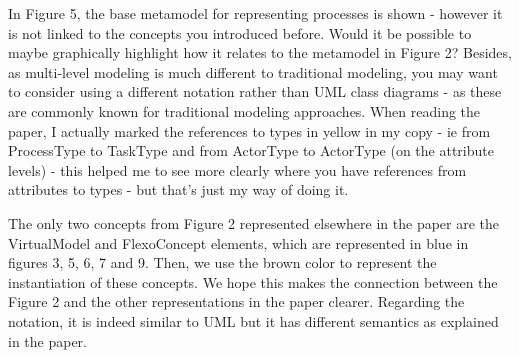 \documentclass[10pt]{article}
\begin{document}
\begin{response}{In Figure 5, the base metamodel for representing processes is shown - however it is not linked to the concepts you introduced before. Would it be possible to maybe graphically highlight how it relates to the metamodel in Figure 2? Besides, as multi-level modeling is much different to traditional modeling, you may want to consider using a different notation rather than UML class diagrams - as these are commonly known for traditional modeling approaches. When reading the paper, I actually marked the references to types in yellow in my copy - ie from ProcessType to TaskType and from ActorType to ActorType (on the attribute levels) - this helped me to see more clearly where you have references from attributes to types - but that's just my way of doing it.}

The only two concepts from Figure 2 represented elsewhere in the paper are the \textsf{VirtualModel} and \textsf{FlexoConcept} elements, which are represented in blue in figures 3, 5, 6, 7 and 9. Then, we use the brown color to represent the instantiation of these concepts. We hope this makes the connection between the Figure 2 and the other representations in the paper clearer. Regarding the notation, it is indeed similar to UML but it has different semantics as explained in the paper.



\end{response}
\end{document}
